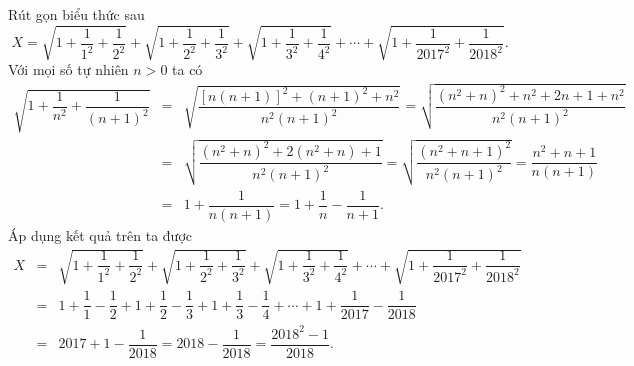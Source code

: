 \begin{ex}%
 Rút gọn biểu thức sau
 $$X = \sqrt{1+\dfrac{1}{1^2}+\dfrac{1}{2^2}} + \sqrt{1+\dfrac{1}{2^2}+\dfrac{1}{3^2}} + \sqrt{1+\dfrac{1}{3^2}+\dfrac{1}{4^2}} + \cdots + \sqrt{1+\dfrac{1}{2017^2}+\dfrac{1}{2018^2}}.$$
 \loigiai
  {
  Với mọi số tự nhiên $n > 0$ ta có
  \allowdisplaybreaks
  \begin{eqnarray*}
   \sqrt{1 + \dfrac{1}{n^2} + \dfrac{1}{(n+1)^2}} &=& \sqrt{\dfrac{\left[n(n+1)\right]^2 + (n+1)^2 + n^2}{n^2(n+1)^2}} = \sqrt{\dfrac{(n^2+n)^2 + n^2+2n+1 + n^2}{n^2(n+1)^2}}\\
   &=& \sqrt{\dfrac{(n^2+n)^2 + 2(n^2+n) + 1}{n^2(n+1)^2}} = \sqrt{\dfrac{(n^2+n+1)^2}{n^2(n+1)^2}} = \dfrac{n^2+n+1}{n(n+1)}\\
   &=& 1 + \dfrac{1}{n(n+1)} = 1 + \dfrac{1}{n} - \dfrac{1}{n+1}.
  \end{eqnarray*}
  Áp dụng kết quả trên ta được
  \allowdisplaybreaks
  \begin{eqnarray*}
   X &=& \sqrt{1+\dfrac{1}{1^2}+\dfrac{1}{2^2}} + \sqrt{1+\dfrac{1}{2^2}+\dfrac{1}{3^2}} + \sqrt{1+\dfrac{1}{3^2}+\dfrac{1}{4^2}} + \cdots + \sqrt{1+\dfrac{1}{2017^2}+\dfrac{1}{2018^2}}\\
   &=& 1 + \dfrac{1}{1} - \dfrac{1}{2} + 1 + \dfrac{1}{2} - \dfrac{1}{3} + 1 + \dfrac{1}{3} - \dfrac{1}{4} + \cdots + 1 + \dfrac{1}{2017} - \dfrac{1}{2018}\\
   &=& 2017 + 1 - \dfrac{1}{2018} = 2018 - \dfrac{1}{2018} = \dfrac{2018^2 - 1}{2018}.
  \end{eqnarray*}
  }
\end{ex}

